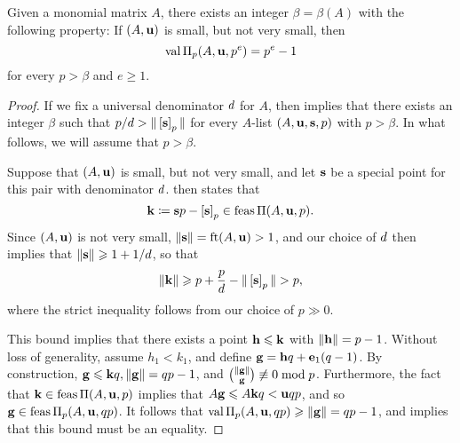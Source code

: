 \documentclass{amsart}
\begin{document}

\begin{theorem}
   \label{small not very small value: T}
   Given a monomial matrix $A$, there exists an integer $\beta=\beta(A)$ with the following property\textup:
   If $(A, \mathbf{u})$ is small, but not very small, then  \[ \operatorname{val} \Pi_p(A, \mathbf{u}, p^e) = p^e-1\] for every $p > \beta$ and $e \geq 1$.
\end{theorem}

\begin{proof}
   If we fix a universal denominator $d$ for $A$, then  implies that there exists an integer $\beta$ such that $p/d > \| \left[ \mathbf{s} \right]_p \|$ for every $A$-list $(A,\mathbf{u},\mathbf{s}, p)$ with $p > \beta$.
   In what follows, we will assume that $p > \beta$.

   Suppose that $(A,\mathbf{u})$ is small, but not very small, and let $\mathbf{s}$ be a special point for this pair with denominator $d$.
    then states that
   \[ \mathbf{k} \coloneqq \mathbf{s}p-\left[ \mathbf{s} \right]_p \in \operatorname{feas} \Pi(A,\mathbf{u},p). \]
   Since $(A,\mathbf{u})$ is not very small, $\| \mathbf{s} \| = \operatorname{ft}(A, \mathbf{u}) > 1$, and our choice of $d$ then implies that $\| \mathbf{s} \| \geqslant 1 + 1/d$, so that
   \[\| \mathbf{k} \| \geqslant p + \frac{p}{d} - \| \left[ \mathbf{s} \right]_p \| > p,\]
   where the strict inequality follows from our choice of $p \gg 0$.

   This bound implies that there exists a point $\mathbf{h} \leqslant \mathbf{k}$ with $\| \mathbf{h} \| = p-1$.
   Without loss of generality, assume $h_1 < k_1$, and define $\mathbf{g} = \mathbf{h}q + \mathbf{e}_1(q-1)$.
   By construction, $\mathbf{g} \leqslant \mathbf{k}q, \| \mathbf{g} \| = qp-1$, and $\binom{\| \mathbf{g} \|}{\mathbf{g}} \not\equiv 0 \bmod p$.
   Furthermore, the fact that $\mathbf{k} \in \operatorname{feas} \Pi(A,\mathbf{u},p)$ implies that $A\mathbf{g} \leqslant A{\mathbf{k}}q < \mathbf{u}qp$, and so $\mathbf{g} \in \operatorname{feas} \Pi_p(A,\mathbf{u},qp)$.
   It follows that $\operatorname{val} \Pi_p(A,\mathbf{u},qp) \geqslant \| \mathbf{g} \| = qp-1$, and  implies that this bound must be an equality.
\end{proof}
\end{document}
